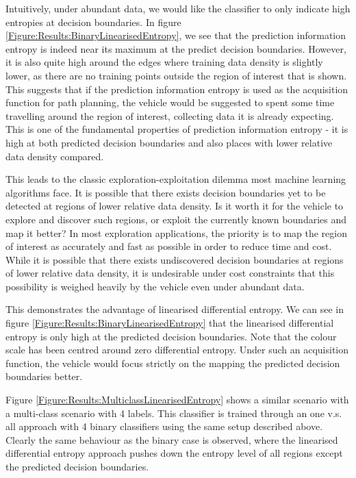 \documentclass{article}
\begin{document}
		Intuitively, under abundant data, we would like the classifier to only indicate high entropies at decision boundaries. In figure \ref{Figure:Results:BinaryLinearisedEntropy}, we see that the prediction information entropy is indeed near its maximum at the predict decision boundaries. However, it is also quite high around the edges where training data density is slightly lower, as there are no training points outside the region of interest that is shown. This suggests that if the prediction information entropy is used as the acquisition function for path planning, the vehicle would be suggested to spent some time travelling around the region of interest, collecting data it is already expecting. This is one of the fundamental properties of prediction information entropy - it is high at both predicted decision boundaries and also places with lower relative data density compared. 
		
		This leads to the classic exploration-exploitation dilemma most machine learning algorithms face. It is possible that there exists decision boundaries yet to be detected at regions of lower relative data density. Is it worth it for the vehicle to explore and discover such regions, or exploit the currently known boundaries and map it better? In most exploration applications, the priority is to map the region of interest as accurately and fast as possible in order to reduce time and cost. While it is possible that there exists undiscovered decision boundaries at regions of lower relative data density, it is undesirable under cost constraints that this possibility is weighed heavily by the vehicle even under abundant data.
		
		This demonstrates the advantage of linearised differential entropy. We can see in figure \ref{Figure:Results:BinaryLinearisedEntropy} that the linearised differential entropy is only high at the predicted decision boundaries. Note that the colour scale has been centred around zero differential entropy. Under such an acquisition function, the vehicle would focus strictly on the mapping the predicted decision boundaries better.
		
		Figure \ref{Figure:Results:MulticlassLinearisedEntropy} shows a similar scenario with a multi-class scenario with 4 labels. This classifier is trained through an one v.s. all approach with 4 binary classifiers using the same setup described above. Clearly the same behaviour as the binary case is observed, where the linearised differential entropy approach pushes down the entropy level of all regions except the predicted decision boundaries.
		
\end{document}
